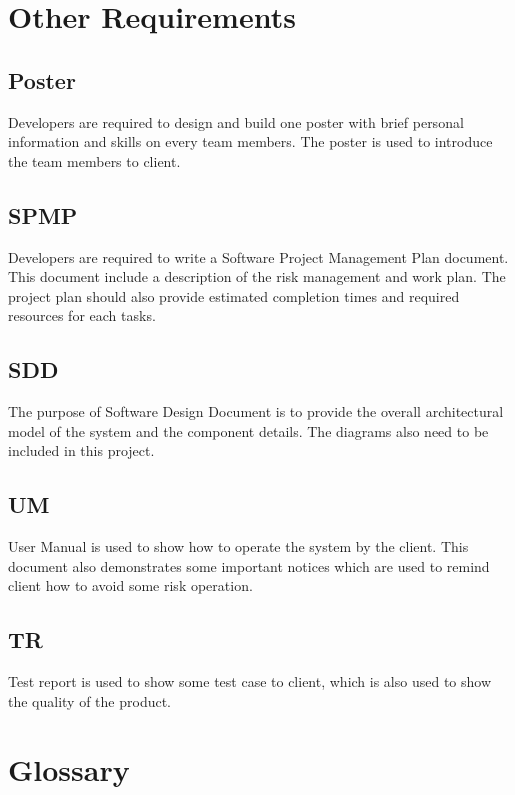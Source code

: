 \documentclass[11pt, a4paper]{report}
\begin{document}
\chapter{Other Requirements}
\section{Poster}
Developers are required to design and build one poster with brief personal information and skills on every team members. The poster is used to introduce the team members to client.

\section{SPMP}
Developers are required to write a Software Project Management Plan document. This document include a description of the risk management and work plan. The project plan should also provide estimated completion times and required resources for each tasks.

\section{SDD}
The purpose of Software Design Document is to provide the overall architectural model of the system and the component details. The diagrams also need to be included in this project.


\section{UM}
User Manual is used to show how to operate the system by the client. This document also demonstrates some important notices which are used to remind client how to avoid some risk operation. 
\section{TR}
Test report is used to show some test case to client, which is also used to show the quality of the product. 


\pagebreak

\newpage
\appendix

\pagebreak

\chapter{Glossary}
\end{document}
